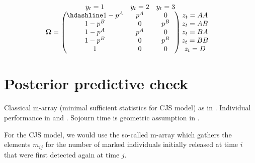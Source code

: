 \documentclass[
  12pt,
]{krantz}
\begin{document}
\[\begin{matrix}
& \\
\mathbf{\Omega} =
\left ( \vphantom{ \begin{matrix} 12 \\ 12 \\ 12 \\ 12 \\ 12\end{matrix} } \right .
\end{matrix}
\hspace{-1.2em}
\begin{matrix}
y_t=1 & y_t=2 & y_t=3 \\ \hdashline
1 - p^A & p^A & 0\\
1 - p^B & 0 & p^B\\
1 - p^A & p^A & 0\\
1 - p^B & 0 & p^B\\
1 & 0 & 0
\end{matrix}
\hspace{-0.2em}
\begin{matrix}
& \\
\left . \vphantom{ \begin{matrix} 12 \\ 12 \\ 12 \\ 12 \\ 12\end{matrix} } \right )
\begin{matrix}
z_t=AA \\ z_t=AB \\ z_t=BA \\ z_t=BB \\ z_t=D
\end{matrix}
\end{matrix}\]

\section{Posterior predictive check}\label{ppchecks}

Classical m-array (minimal sufficient statistics for CJS model) as in \citet{paganin2023computational}. Individual performance in \citet{chambert2014} and \citet{nater2020trout}. Sojourn time is geometric assumption in \citet{conn2018}.

For the CJS model, we would use the so-called m-array which gathers the elements \(m_{ij}\) for the number of marked individuals initially released at time \(i\) that were first detected again at time \(j\).
\end{document}
